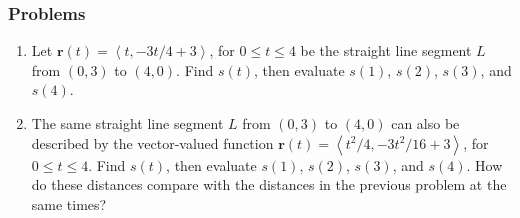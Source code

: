 \documentclass[12pt,letterpaper,fleqn]{article}
\newcommand{\lv}[1]{\ensuremath{\left\langle #1 \right\rangle}}
\renewcommand{\vec}[1]{\ensuremath{\pmb{#1}}}
\begin{document}
  \subsubsection*{Problems}
  \begin{enumerate}
    \item Let $\vec{r}(t) = \lv{t, -3t/4 + 3}$, for $0\leq t\leq 4$ be the straight line segment $L$ from $(0,3)$ to $(4,0)$. Find $s(t)$, then evaluate $s(1)$, $s(2)$, $s(3)$, and $s(4)$.
    \item The same straight line segment $L$ from $(0,3)$ to $(4,0)$ can also be described by the vector-valued function $\vec{r}(t) = \lv{t^2/4, -3t^2/16 + 3}$, for $0\leq t\leq 4$. Find $s(t)$, then evaluate $s(1)$, $s(2)$, $s(3)$, and $s(4)$. How do these distances compare with the distances in the previous problem at the same times?
  \end{enumerate}
\end{document}
